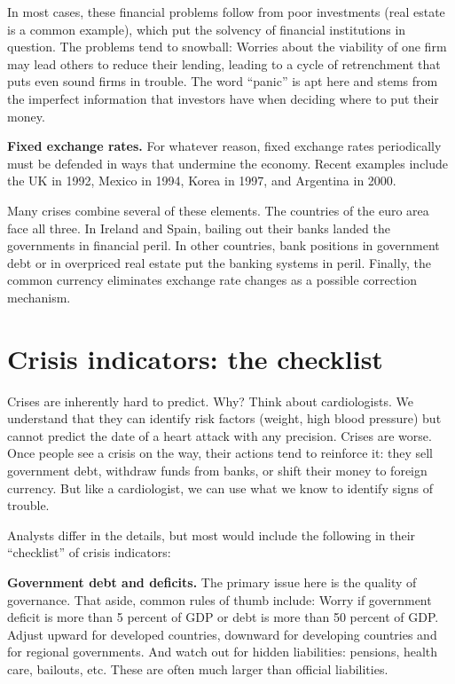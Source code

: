 In most cases, these financial problems follow from
poor investments (real estate is a common example),
which put the solvency of financial institutions in question.
The problems tend to snowball: Worries about the viability of one firm may lead others to
reduce their lending, leading to a cycle of retrenchment
that puts even sound firms in trouble.
The word ``panic'' is apt here and stems
from the imperfect information that investors have
when deciding where to put their money.


\textbf{Fixed exchange rates.} For whatever reason, fixed exchange rates periodically
must be defended in ways that undermine the economy.
Recent examples include the UK in 1992,
Mexico in 1994,
Korea in 1997,
and Argentina in 2000.

Many crises combine several of these elements.
The countries of the euro area face all three.
In Ireland and Spain, bailing out their banks
landed the governments in financial peril.
In other countries, bank positions in government debt
or in overpriced real estate put the banking systems in peril.
Finally, the common currency eliminates exchange rate changes
as a possible correction mechanism.


\section{Crisis indicators: the checklist }

Crises are inherently hard to predict.
Why?
Think about cardiologists.
We understand that they can identify risk factors
(weight, high blood pressure) but cannot predict
the date of a heart attack with any precision.
Crises are worse.
Once people see a crisis on the way,
their actions tend to reinforce it:
they sell government debt,
withdraw funds from banks,
or shift their money to foreign currency.
But like a cardiologist, we can use what we know
to identify signs of trouble.


Analysts differ in the details, but most would include
the following in their ``checklist'' of crisis indicators:

\textbf{Government debt and deficits.}
The primary issue here is the quality of governance.
That aside, common rules of thumb include:
Worry if government
deficit is more than 5 percent of GDP or debt is more than 50 percent of GDP.
Adjust upward for developed countries, downward for developing countries
and for regional governments.
And watch out for hidden liabilities:  pensions, health care, bailouts, etc.
These are often much larger than official liabilities.


